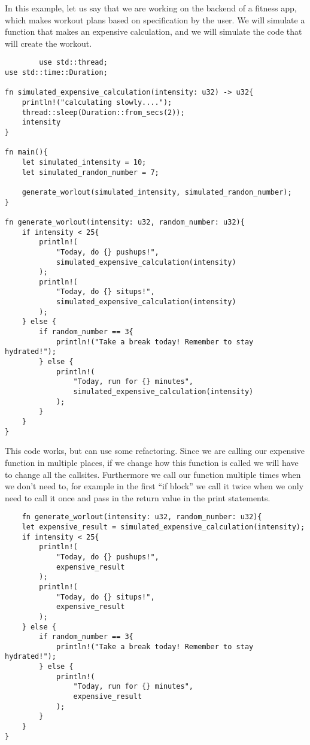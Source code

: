 \begin{example}
    In this example, let us say that we are working on the backend of a fitness app, which makes workout plans based on specification by the user.
    We will simulate a function that makes an expensive calculation, and we will simulate the code that will create the workout. 

    \begin{lstlisting}
        use std::thread;
use std::time::Duration;

fn simulated_expensive_calculation(intensity: u32) -> u32{
    println!("calculating slowly....");
    thread::sleep(Duration::from_secs(2));
    intensity
}

fn main(){
    let simulated_intensity = 10;
    let simulated_randon_number = 7;

    generate_worlout(simulated_intensity, simulated_randon_number);
}

fn generate_worlout(intensity: u32, random_number: u32){
    if intensity < 25{
        println!(
            "Today, do {} pushups!", 
            simulated_expensive_calculation(intensity)
        );
        println!(
            "Today, do {} situps!", 
            simulated_expensive_calculation(intensity)
        );
    } else {
        if random_number == 3{
            println!("Take a break today! Remember to stay hydrated!");
        } else {
            println!(
                "Today, run for {} minutes",
                simulated_expensive_calculation(intensity)
            );
        }
    }
}
    \end{lstlisting}

This code works, but can use some refactoring. Since we are calling our expensive function in multiple places, if we change how this function is called we will have to change all the callsites. Furthermore we call our function multiple times when we don't need to, for example in the first ``if block'' we call it twice when we only need to call 
it once and pass in the return value in the print statements.
\begin{lstlisting}
    fn generate_worlout(intensity: u32, random_number: u32){
    let expensive_result = simulated_expensive_calculation(intensity);
    if intensity < 25{
        println!(
            "Today, do {} pushups!", 
            expensive_result
        );
        println!(
            "Today, do {} situps!", 
            expensive_result
        );
    } else {
        if random_number == 3{
            println!("Take a break today! Remember to stay hydrated!");
        } else {
            println!(
                "Today, run for {} minutes",
                expensive_result
            );
        }
    }
}
\end{lstlisting}


\end{example}
